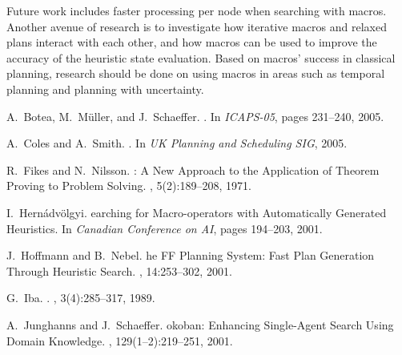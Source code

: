 \documentclass{article}
\begin{document}
Future work includes faster processing per node when searching with macros.
Another avenue of research is to investigate how iterative macros and relaxed plans
interact with each other, and how macros can be used to improve the
accuracy of the heuristic state evaluation.
Based on macros' success in classical planning, 
research should be done on using macros in areas
such as temporal planning and planning with uncertainty.

\begin{thebibliography}{}

A.~Botea, M.~M\"{u}ller, and J.~Schaeffer.
.
\newblock In {\em ICAPS-05}, pages 231--240, 2005.

A.~Coles and A.~Smith.
.
\newblock In {\em UK Planning and Scheduling SIG}, 2005.

R.~Fikes and N.~Nilsson.
: {A} {N}ew {A}pproach to the {A}pplication of {T}heorem
  {P}roving to {P}roblem {S}olving.
, 5(2):189--208, 1971.

I.~Hern{\'{a}}dv\"{o}lgyi.
earching for {M}acro-operators with {A}utomatically {G}enerated
  {H}euristics.
\newblock In {\em Canadian Conference on AI}, pages 194--203, 2001.

J.~Hoffmann and B.~Nebel.
he {FF} {P}lanning {S}ystem: {F}ast {P}lan {G}eneration {T}hrough
  {H}euristic {S}earch.
, 14:253--302, 2001.

G.~Iba.
.
, 3(4):285--317, 1989.

A.~Junghanns and J.~Schaeffer.
okoban: {E}nhancing {S}ingle-{A}gent {S}earch {U}sing {D}omain
  {K}nowledge.
, 129(1--2):219--251, 2001.


\end{thebibliography}
\end{document}
